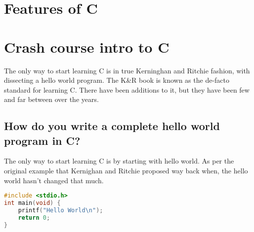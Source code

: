 \section{Features of C}

\section{Crash course intro to C}

The only way to start learning C is in true Kerninghan and Ritchie fashion, with dissecting a hello world program. The K\&R book is known as the de-facto standard for learning C. There have been additions to it, but they have been few and far between over the years.

\subsection{How do you write a complete hello world program in C?}

The only way to start learning C is by starting with hello world. As per the original example that Kernighan and Ritchie proposed way back when, the hello world hasn't changed that much.

\begin{lstlisting}[language=C]
#include <stdio.h>
int main(void) { 
    printf("Hello World\n");
    return 0; 
}
\end{lstlisting}

